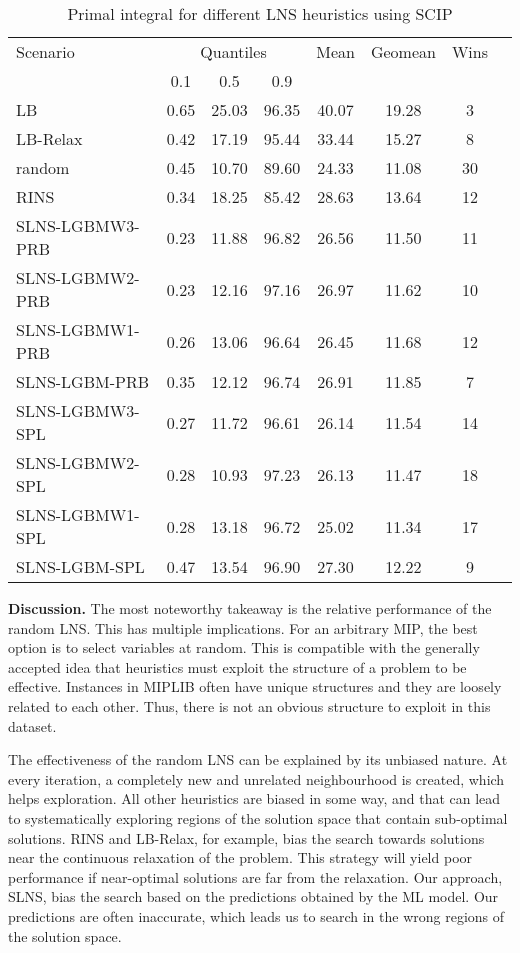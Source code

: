\documentclass[3p, authoryear, times]{elsarticle}
\begin{document}
\begin{table}[h]
\centering
\caption{Primal integral for different LNS heuristics using SCIP}
\label{tab:lns:primal_integral_scip}
\begin{tabular}{lccccccc}
\toprule
{Scenario} & \multicolumn{3}{c}{Quantiles} & {Mean} & {Geomean} & {Wins} \\
{} & {0.1} & {0.5} & {0.9} & {} & {} & {} \\
\midrule
LB & 0.65 & 25.03 & 96.35 & 40.07 & 19.28 & 3 \\
LB-Relax & 0.42 & 17.19 & 95.44 & 33.44 & 15.27 & 8 \\
random & 0.45 & 10.70 & 89.60 & 24.33 & 11.08 & 30 \\
RINS & 0.34 & 18.25 & 85.42 & 28.63 & 13.64 & 12 \\
SLNS-LGBMW3-PRB & 0.23 & 11.88 & 96.82 & 26.56 & 11.50 & 11 \\
SLNS-LGBMW2-PRB & 0.23 & 12.16 & 97.16 & 26.97 & 11.62 & 10 \\
SLNS-LGBMW1-PRB & 0.26 & 13.06 & 96.64 & 26.45 & 11.68 & 12 \\
SLNS-LGBM-PRB & 0.35 & 12.12 & 96.74 & 26.91 & 11.85 & 7 \\
SLNS-LGBMW3-SPL & 0.27 & 11.72 & 96.61 & 26.14 & 11.54 & 14 \\
SLNS-LGBMW2-SPL & 0.28 & 10.93 & 97.23 & 26.13 & 11.47 & 18 \\
SLNS-LGBMW1-SPL & 0.28 & 13.18 & 96.72 & 25.02 & 11.34 & 17 \\
SLNS-LGBM-SPL & 0.47 & 13.54 & 96.90 & 27.30 & 12.22 & 9 \\
\bottomrule
\end{tabular}
\end{table}




\textbf{Discussion. } 
The most noteworthy takeaway is the relative performance of the random LNS. This has multiple implications. For an arbitrary MIP, the best option is to select variables at random. This is compatible with the generally accepted idea that heuristics must exploit the structure of a problem to be effective. Instances in MIPLIB often have unique structures and they are loosely related to each other. Thus, there is not an obvious structure to exploit in this dataset. 

The effectiveness of the random LNS can be explained by its unbiased nature. At every iteration, a completely new and unrelated neighbourhood is created, which helps exploration.  All other heuristics are biased in some way, and that can lead to systematically exploring regions of the solution space that contain sub-optimal solutions. RINS and LB-Relax, for example, bias the search towards solutions near the continuous relaxation of the problem. This strategy will yield poor performance if near-optimal solutions are far from the relaxation.  Our approach, SLNS, bias the search based on the predictions obtained by the ML model. Our predictions are often inaccurate, which leads us to search in the wrong regions of the solution space. 
\end{document}
